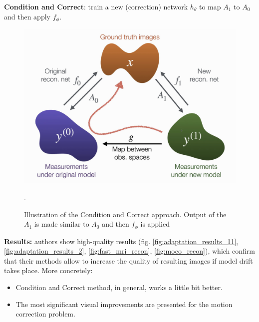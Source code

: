 {\bf Condition and Correct}: train a new (correction) network $h_{\theta}$ to map $A_1$ to $A_0$ and then apply $f_{\phi}$.

\begin{figure}[h!]
    \centering
    \includegraphics[scale=0.4]{neurips-2020/images/Screenshot 2020-12-13 at 21.24.26.png}
    \caption{Illustration of the Condition and Correct approach. Output of the $A_1$ is made similar to $A_0$ and then $f_\phi$ is applied}.
    \label{fig:my_label}
\end{figure}



{\bf Results:} authors show high-quality results (fig. \ref{fig:adaptation_results_11}, \ref{fig:adaptation_results_2}, \ref{fig:fast_mri_recon}, \ref{fig:moco_recon}), which confirm that their methods allow to increase the quality of resulting images if model drift takes place.
More concretely:
\begin{itemize}
    \item Condition and Correct method, in general, works a little bit better.
    \item The most significant visual improvements are presented for the motion correction problem.
    \label{fig:adaptation_results_11}
\end{itemize}


